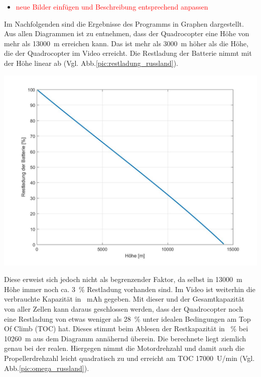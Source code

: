 \begin{itemize}
	\item \textcolor{red}{neue Bilder einfügen und Beschreibung entsprechend anpassen}
\end{itemize}





Im Nachfolgenden sind die Ergebnisse des Programms in Graphen dargestellt. Aus allen Diagrammen ist zu entnehmen, dass der Quadrocopter eine Höhe von mehr als \SI{13000}{m} erreichen kann. Das ist mehr als \SI{3000}{m} höher als die Höhe, die der Quadrocopter im Video erreicht.
Die Restladung der Batterie nimmt mit der Höhe linear ab (Vgl. Abb.\ref{pic:restladung_russland}).  
\begin{center}
	\includegraphics[scale=0.3]{Diagramme/C_Rest_V.jpg}
	\label{pic:restladung_russland}
\end{center}
Diese erweist sich jedoch nicht als begrenzender Faktor, da selbst in \SI{13000}{m} Höhe immer noch ca. \SI{3}{\%} Restladung vorhanden sind. Im Video ist weiterhin die verbrauchte Kapazität in \SI{}{mAh} gegeben. Mit dieser und der Gesamtkapazität von aller Zellen kann daraus geschlossen werden, dass der Quadrocopter noch eine Restladung von etwas weniger als \SI{28}{\%} unter idealen Bedingungen am Top Of Climb (TOC) hat. Dieses stimmt beim Ablesen der Restkapazität in \SI{}{\%} bei \SI{10260}{m} aus dem Diagramm annähernd überein. Die berechnete liegt ziemlich genau bei der realen.
Hiergegen nimmt die Motordrehzahl und damit auch die Propellerdrehzahl leicht quadratisch zu und erreicht am TOC \SI{17000}{U/min} (Vgl. Abb.\ref{pic:omega_russland}).  
